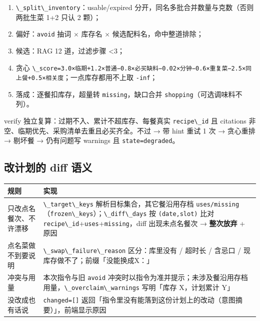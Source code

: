 \begin{enumerate}
\def\labelenumi{\arabic{enumi}.}
\tightlist
\item
  \passthrough{\lstinline!\_split\_inventory!}：usable/expired
  分开，同名多批合并数量与克数（否则两批生菜 1+2 只认 2 颗）；
\item
  偏好：\passthrough{\lstinline!avoid!} 抽词 × 库存名 ×
  候选配料名，命中整道排除；
\item
  候选：RAG 12 道，过滤步骤 \textless3；
\item
  贪心
  \passthrough{\lstinline!\_score=3.0×临期+1.2×普通−0.8×必买缺料−0.02×分钟−0.6×重复菜−2.5×同上餐+0.5×相关度!}；一点库存都用不上取
  \passthrough{\lstinline!-inf!}；
\item
  落成：逐餐扣库存，超量转 \passthrough{\lstinline!missing!}，缺口合并
  \passthrough{\lstinline!shopping!}（可选调味料不列）。
\end{enumerate}

verify 独立复算：过期不入、累计不超库存、每餐真实
\passthrough{\lstinline!recipe\_id!} 且 citations
非空、临期优先、采购清单去重且必买齐全。不过 → 带 hint 重试 1 次 →
贪心重排 → 剔坏餐 → 仍有问题写 warnings 且
\passthrough{\lstinline!state=degraded!}。

\subsection{改计划的 diff
语义}\label{ux6539ux8ba1ux5212ux7684-diff-ux8bedux4e49}

{\def\LTcaptype{none} %
\begin{longtable}[]{@{}
  >{\raggedright\arraybackslash}p{}
  >{\raggedright\arraybackslash}p{}@{}}
\toprule\noalign{}
\begin{minipage}[b]{\linewidth}\raggedright
规则
\end{minipage} & \begin{minipage}[b]{\linewidth}\raggedright
实现
\end{minipage} \\
\midrule\noalign{}
\endhead
\bottomrule\noalign{}
\endlastfoot
只改点名餐次、不许漂移 & \passthrough{\lstinline!\_target\_keys!}
解析目标集合，其它餐沿用存档
\passthrough{\lstinline!uses/missing!}（\passthrough{\lstinline!frozen\_keys!}）；\passthrough{\lstinline!\_diff\_days!}
按 \passthrough{\lstinline!(date,slot)!} 比对
\passthrough{\lstinline!recipe\_id!}+\passthrough{\lstinline!uses!}+\passthrough{\lstinline!missing!}，diff
出现未点名餐次 → \textbf{整次放弃} + 原因 \\
点名菜做不到要说明 & \passthrough{\lstinline!\_swap\_failure\_reason!}
区分：库里没有 / 超时长 / 含忌口 / 现库存做不了；前缀「没能换成X：」 \\
冲突与用量 & 本次指令与旧 \passthrough{\lstinline!avoid!}
冲突时以指令为准并提示；未涉及餐沿用存档用量，\passthrough{\lstinline!\_overclaim\_warnings!}
写明「库存 X，计划累计 Y」 \\
没改成也有话说 & \passthrough{\lstinline!changed=[]!}
返回「指令里没有能落到这份计划上的改动（意图摘要）」，前端显示原因 \\
\end{longtable}
}

